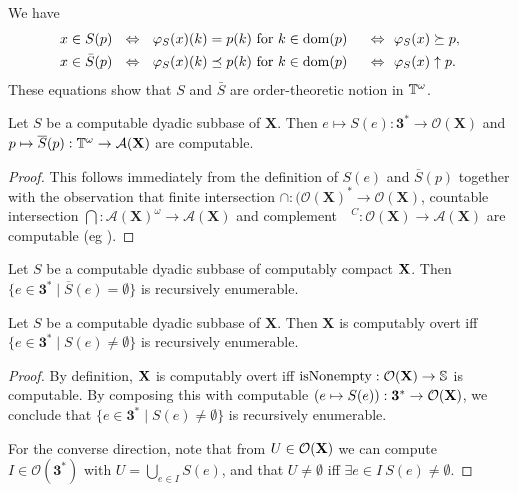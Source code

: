 \documentclass{eptcs-modified}
\begin{document}
We have
\begin{alignat}{2}
x\in S(p)&\  \  \Leftrightarrow\  \  \varphi_S(x)(k)=p(k)\text{ for }k\in \operatorname{dom} (p) &
\  \  \Leftrightarrow\  \   &\varphi_S(x) \succeq p
,\label{eq:s}\\
x\in \bar{S}(p) &\  \  \Leftrightarrow\  \
\varphi_S(x)(k) \preceq p(k)\text{ for } k\in \operatorname{dom}(p)&
\  \  \Leftrightarrow\  \   &\varphi_S(x)\uparrow p.\label{eq:cs}
\end{alignat}
These equations show that $S$ and $\bar{S}$ are order-theoretic notion in $\mathbb{T}^\omega$.


\begin{proposition}
\label{prop:dyadicsubbase}
Let $S$ be a computable dyadic subbase of $\mathbf{X}$. Then $e \mapsto S(e) : \mathbf{3}^* \to \mathcal{O}(\mathbf{X})$ and $p \mapsto \overline{S}(p) : \mathbb{T}^\omega \to \mathcal{A}(\mathbf{X})$ are computable.
\begin{proof}
This follows immediately from the definition of $S(e)$ and $\overline{S}(p)$ together with the observation that finite intersection $\cap : (\mathcal{O}(\mathbf{X})^* \to \mathcal{O}(\mathbf{X})$, countable intersection $\bigcap : \mathcal{A}(\mathbf{X})^\omega \to \mathcal{A}(\mathbf{X})$ and complement $\phantom{U}^C : \mathcal{O}(\mathbf{X}) \to \mathcal{A}(\mathbf{X})$ are computable (eg \cite{pauly-synthetic}).
\end{proof}
\end{proposition}

\begin{corollary}
\label{corr:compactsemicharac}
Let $S$ be a computable dyadic subbase of computably compact $\mathbf{X}$. Then $\{e \in \mathbf{3}^* \mid \overline{S}(e) = \emptyset\}$ is recursively enumerable.
\end{corollary}


\begin{proposition}
\label{prop:overtcharac}
Let $S$ be a computable dyadic subbase of $\mathbf{X}$. Then $\mathbf{X}$ is computably overt iff $\{e \in \mathbf{3}^* \mid S(e) \neq \emptyset\}$ is recursively enumerable.
\begin{proof}
By definition, $\mathbf{X}$ is computably overt iff $\operatorname{isNonempty} : \mathcal{O}(\mathbf{X}) \to \mathbb{S}$ is computable. By composing this with computable $(e \mapsto S(e)) : \mathbf{3}^* \to \mathcal{O}(\mathbf{X})$, we conclude that $\{e \in \mathbf{3}^* \mid S(e) \neq \emptyset\}$ is recursively enumerable.

For the converse direction, note that from $U \in \mathcal{O}(\mathbf{X})$ we can compute $I \in \mathcal{O}(\mathbf{3}^*)$ with $U = \bigcup_{e \in I} S(e)$, and that $U \neq \emptyset$ iff $\exists e \in I \ S(e) \neq \emptyset$.
\end{proof}
\end{proposition}
\end{document}
